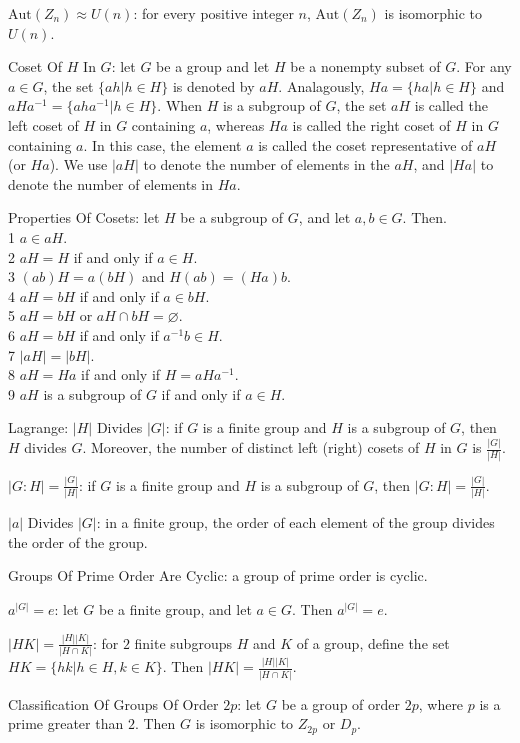 $\text{Aut}(Z_n) \approx U(n)$: for every positive integer $n$, $\text{Aut}(Z_n)$ is isomorphic to $U(n)$.

Coset Of $H$ In $G$: let $G$ be a group and let $H$ be a nonempty subset of $G$. For any $a \in G$, the set $\{ ah | h \in H \}$ is denoted by $aH$. Analagously, $Ha = \{ha | h \in H \}$ and $aHa^{-1} = \{aha^{-1} | h \in H \}$. When $H$ is a subgroup of $G$, the set $aH$ is called the left coset of $H$ in $G$ containing $a$, whereas $Ha$ is called the right coset of $H$ in $G$ containing $a$. In this case, the element $a$ is called the coset representative of $aH$ (or $Ha$). We use $|aH|$ to denote the number of elements in the $aH$, and $|Ha|$ to denote the number of elements in $Ha$.

Properties Of Cosets: let $H$ be a subgroup of $G$, and let $a,b \in G$. Then. \\
1 $a \in aH$. \\
2 $aH=H$ if and only if $a \in H$. \\
3 $(ab)H=a(bH)$ and $H(ab)=(Ha)b$. \\
4 $aH=bH$ if and only if $a \in bH$. \\
5 $aH=bH$ or $aH \cap bH = \varnothing$. \\
6 $aH=bH$ if and only if $a^{-1}b \in H$. \\
7 $|aH|=|bH|$. \\
8 $aH=Ha$ if and only if $H=aHa^{-1}$. \\
9 $aH$ is a subgroup of $G$ if and only if $a \in H$.

Lagrange: $|H|$ Divides $|G|$: if $G$ is a finite group and $H$ is a subgroup of $G$, then $H$ divides $G$. Moreover, the number of distinct left (right) cosets of $H$ in $G$ is $\frac{|G|}{|H|}$.

$|G:H| = \frac{|G|}{|H|}$: if $G$ is a finite group and $H$ is a subgroup of $G$, then $|G:H| = \frac{|G|}{|H|}$.

$|a|$ Divides $|G|$: in a finite group, the order of each element of the group divides the order of the group.

Groups Of Prime Order Are Cyclic: a group of prime order is cyclic.

$a^{|G|}=e$: let $G$ be a finite group, and let $a \in G$. Then $a^{|G|}=e$.

$|HK|=\frac{|H| |K|}{|H \cap K|}$: for $2$ finite subgroups $H$ and $K$ of a group, define the set $HK = \{hk | h \in H,k \in K \}$. Then $|HK|=\frac{|H| |K|}{|H \cap K|}$.

Classification Of Groups Of Order $2p$: let $G$ be a group of order $2p$, where $p$ is a prime greater than $2$. Then $G$ is isomorphic to $Z_{2p}$ or $D_p$.

